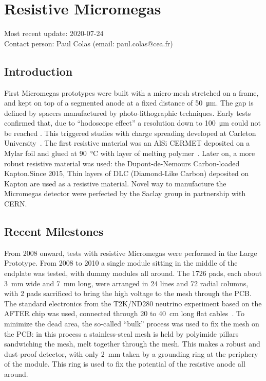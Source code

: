 \section{Resistive Micromegas}
\label{chap:TPC_sec:micromegas}
Most recent update: 2020-07-24\\
Contact person: Paul Colas (email: paul.colas@cea.fr)\\

\subsection{Introduction}
First Micromegas prototypes were built with a micro-mesh stretched on a frame, and kept on top of
a segmented anode at a fixed distance of \SI{50}{\micro \meter}. The gap is defined by spacers manufactured
by photo-lithographic techniques. Early tests confirmed that, due to ``hodoscope effect'' a resolution
down to \SI{100}{\micro \meter} could not be reached \cite{Arogancia:2007pt}. This triggered studies with charge spreading
developed at Carleton University~\cite{Dixit:2003qg}.
The first resistive material was an AlSi CERMET deposited on a Mylar foil and glued at
\SI{90}{\degreeCelsius} with layer of melting polymer~\cite{2007NIMPA.581..254D}. Later on, a more robust resistive material was
used: the Dupont-de-Nemours Carbon-loaded Kapton.Since 2015, Thin layers of DLC (Diamond-Like Carbon) deposited on Kapton are used as a resistive material. 
Novel way to manufacture the Micromegas detector
were perfected by the Saclay group in partnership with CERN.


\subsection{Recent Milestones}
From 2008 onward, tests with resistive Micromegas were performed in the Large Prototype. From 2008 to 2010
a single module sitting in the middle of the endplate was tested, with dummy modules all around. The 1726 pads, each about \SI{3}{mm} wide
and \SI{7}{mm} long,
were arranged in 24 lines and 72 radial columns, with 2 pads sacrificed to bring the high voltage to the mesh
through the PCB. The standard electronics from the T2K/ND280 neutrino experiment based on the AFTER chip
was used, connected through 20 to \SI{40}{cm} long flat cables~\cite{6418152}.
To minimize the dead area, the so-called ``bulk'' \cite{Giomataris:2004aa} process was used to fix the
mesh on the PCB: in this process a stainless-steal mesh is held by polyimide pillars sandwiching the mesh, melt together
through the mesh. This makes a robust and dust-proof detector, with only \SI{2}
{mm} taken by a grounding ring at the periphery of the module. This ring is used to fix the potential of the resistive anode all around.

